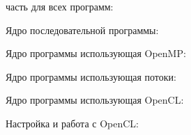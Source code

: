 \documentclass[14pt,final,titlepage,pscyr]{hedwork}
\begin{document}
\newpage

 часть для всех программ:


\newpage

Ядро последовательной программы:


\newpage

Ядро программы использующая OpenMP:


\newpage

Ядро программы использующая потоки:


\newpage

Ядро программы использующая OpenCL:


Настройка и работа с OpenCL:

\end{document}
